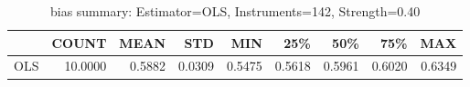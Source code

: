 \begin{table}[ht]
\centering
\caption{bias summary: Estimator=OLS, Instruments=142, Strength=0.40}
\begin{tabular}{lrrrrrrrr}
\toprule
 & COUNT & MEAN & STD & MIN & 25\% & 50\% & 75\% & MAX \\
\midrule
OLS & 10.0000 & 0.5882 & 0.0309 & 0.5475 & 0.5618 & 0.5961 & 0.6020 & 0.6349 \\
\bottomrule
\end{tabular}
\end{table}
